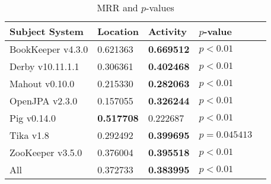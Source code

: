 \begin{table}[t]
\renewcommand{\arraystretch}{1.3}
\footnotesize
\centering
\caption{MRR and $p$-values}
\begin{tabular}{l|ll|ll}
\toprule
Subject System & Location & Activity & $p$-value  \\
\midrule
BookKeeper v4.3.0 & 0.621363 & {\bf 0.669512 } & $p < 0.01$ \\
Derby v10.11.1.1 & 0.306361 & {\bf 0.402468 } & $p < 0.01$ \\
Mahout v0.10.0 & 0.215330 & {\bf 0.282063 } & $p < 0.01$ \\
OpenJPA v2.3.0 & 0.157055 & {\bf 0.326244 } & $p < 0.01$ \\
Pig v0.14.0 & {\bf 0.517708 } & 0.222687 & $p < 0.01$ \\
Tika v1.8 & 0.292492 & {\bf 0.399695 } & $p = 0.045413$ \\
ZooKeeper v3.5.0 & 0.376004 & {\bf 0.395518 } & $p < 0.01$ \\
\midrule
All & 0.372733 & {\bf 0.383995 } & $p < 0.01$ \\
\bottomrule
\end{tabular}
\label{table:rq1:file:lda}
\end{table}
